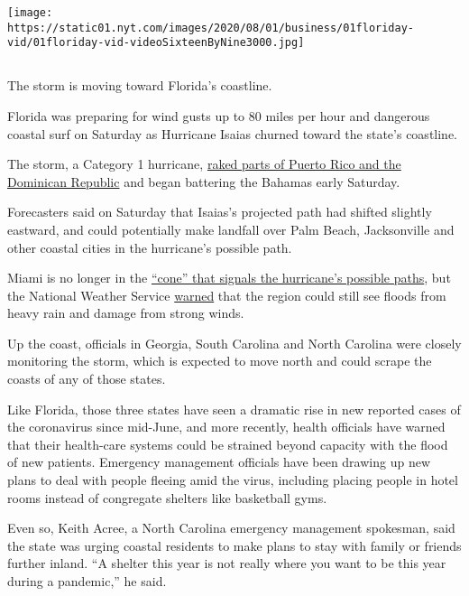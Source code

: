 \texttt{[image: https://static01.nyt.com/images/2020/08/01/business/01floriday-vid/01floriday-vid-videoSixteenByNine3000.jpg]}

\subsection{}

The storm is moving toward Florida's coastline.

Florida was preparing for wind gusts up to 80 miles per hour and
dangerous coastal surf on Saturday as Hurricane Isaias churned toward
the state's coastline.

The storm, a Category 1 hurricane,
\href{https://www.nytimes.com/2020/07/31/us/hurricane-isaias.html}{raked
parts of Puerto Rico and the Dominican Republic} and began battering the
Bahamas early Saturday.

Forecasters said on Saturday that Isaias's projected path had shifted
slightly eastward, and could potentially make landfall over Palm Beach,
Jacksonville and other coastal cities in the hurricane's possible path.

Miami is no longer in the
\href{https://www.nytimes.com/2018/09/11/climate/hurricane-evacuation-path-forecasts.html}{``cone''
that signals the hurricane's possible paths}, but the National Weather
Service
\href{https://forecast.weather.gov/showsigwx.php?warnzone=FLZ073\&warncounty=FLC086\&firewxzone=FLZ073\&local_place1=3\%20Miles\%20W\%20Palm\%20Springs\%20North\%20FL\&product1=Hurricane+Local+Statement\&lat=25.9366\&lon=-80.3793\#.XyWaz_hKjOQ}{warned}
that the region could still see floods from heavy rain and damage from
strong winds.

Up the coast, officials in Georgia, South Carolina and North Carolina
were closely monitoring the storm, which is expected to move north and
could scrape the coasts of any of those states.

Like Florida, those three states have seen a dramatic rise in new
reported cases of the coronavirus since mid-June, and more recently,
health officials have warned that their health-care systems could be
strained beyond capacity with the flood of new patients. Emergency
management officials have been drawing up new plans to deal with people
fleeing amid the virus, including placing people in hotel rooms instead
of congregate shelters like basketball gyms.

Even so, Keith Acree, a North Carolina emergency management spokesman,
said the state was urging coastal residents to make plans to stay with
family or friends further inland. ``A shelter this year is not really
where you want to be this year during a pandemic,'' he said.

